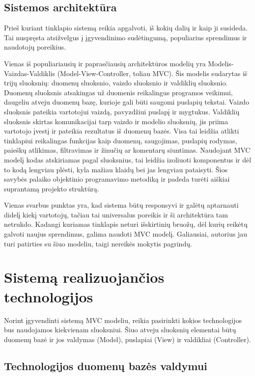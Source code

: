 \documentclass{VUMIFPSkursinis}
\begin{document}
\subsection{Sistemos architektūra}
Prieš kuriant tinklapio sistemą reikia apgalvoti, iš kokių dalių ir kaip ji susideda. Tai nuspręsta atsižvelgus į įgyvendinimo sudėtingumą, populiarius sprendimus ir naudotojų poreikius.

Vienas iš populiariausių ir paprasčiausių architektūros modelių yra Modelis-Vaizdas-Valdiklis (Model-View-Controller, toliau MVC)\cite{MVCDefinition}. Šis modelis sudarytas iš trijų sluoksnių: duomenų sluoksnio, vaizdo sluoksnio ir valdiklių sluoksnio. Duomenų sluoksnis atsakingas už duomenis reikalingus programos veikimui, daugeliu atveju duomenų bazę, kurioje gali būti saugomi puslapių tekstai\cite{MVCSO3}. Vaizdo sluoksnis pateikia vartotojui vaizdą, pavyzdžiui puslapį ir mygtukus. Valdiklių sluoksnis skirtas komunikacijai tarp vaizdo ir modelio sluoksnių, jis priima vartotojo įvestį ir pateikia rezultatus iš duomenų bazės. Visa tai leidžia atlikti tinklapiui reikalingas funkcijas kaip duomenų, saugojimas, puslapių rodymas, paieškų atlikimas, filtravimas ir žinučių ar komentarų siuntimas. Naudojant MVC modelį kodas atskiriamas pagal sluoksnius, tai leidžia izoliuoti komponentus ir dėl to kodą lengviau plėsti, kyla mažiau klaidų bei jas lengviau pataisyti. Šios savybės palaiko objektinio programavimo metodiką ir padeda turėti aiškiai suprantamą projekto struktūrą.

Vienas svarbus punktas yra, kad sistema būtų responsyvi ir galėtų aptarnauti didelį kiekį vartotojų, tačiau tai universalus poreikis ir ši architektūra tam netrukdo. Kadangi kuriamas tinklapis neturi išskirtinių bruožų, dėl kurių reikėtų galvoti naujus sprendimus, galima naudoti MVC modelį\cite{MVCSO1, MVCSO2}. Galiausiai, autorius jau turi patirties su šiuo modeliu, taigi nereikės mokytis pagrindų.

\section{Sistemą realizuojančios technologijos}
Norint įgyvendinti sistemą MVC modeliu, reikia pasirinkti kokios technologijos bus naudojamos kiekvienam sluoksniui. Šiuo atveju sluoksnių elementai būtų duomenų bazė ir jos valdymas (Model), puslapiai (View) ir valdikliai (Controller).

\subsection{Technologijos duomenų bazės valdymui}
\end{document}
